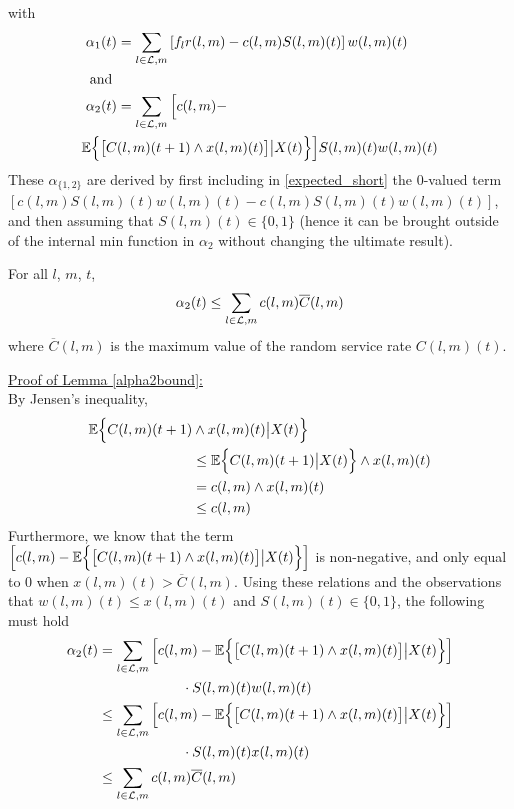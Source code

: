 with 
\begin{align} \label{a1_def}
\alpha_1 (t) &=  \sum_{l \in \linkset,m} \left[ f_l r(l,m) - c(l,m)S(l,m)(t) \right] w(l,m)(t)   \\
\nonumber \text{ and }&  \\ 
 \alpha_2 (t) & =  \sum_{l \in \linkset,m} \Big[ c(l,m)- \\ \nonumber
\expectation{ \big[C & (l,m)(t+1)\wedge x(l,m)(t)\big] \big| X(t) }  \Big] S(l,m)(t)w(l,m)(t)  
\end{align}
These $\alpha_{\{1,2\}}$ are derived by first including in \eqref{expected_short} the $0$-valued term $[c(l,m)S(l,m)(t)w(l,m)(t) - c(l,m)S(l,m)(t)w(l,m)(t)]$, and then assuming that $S(l,m)(t) \in \{0,1\}$ (hence it can be brought outside of the internal min function in $\alpha_2$ without changing the ultimate result). %
\begin{Lem} \label{alpha2bound}
For all $l$, $m$, $t$, 
\begin{equation} 
\alpha_2 (t) \leq \sum_{l \in \mathcal{L},m} c(l,m)\overline{C} (l,m)
\end{equation}
where $\overline{C} (l,m)$ is the maximum value of the random service rate $C(l,m)(t)$. 
\end{Lem}
\underline{Proof of Lemma \ref{alpha2bound}:} \\
By Jensen's inequality, 
\begin{align*}
\mathbb{E}\Big\{ C(l,m)(t+1) & \wedge x(l,m)(t) \big| X(t) \Big\} \\
& \leq \mathbb{E}\Big\{ C(l,m)(t+1) \big| X(t) \Big\}  \wedge x(l,m)(t) \\
&= c(l,m)\wedge x(l,m)(t) \\ 
&\leq c(l,m)
\end{align*}
 Furthermore, we know that the term 
$ \left[ c(l,m)- \mathbb{E}\Big\{  \big[C(l,m)(t+1)\wedge x(l,m)(t)\big] \big| X(t)  \Big\}  \right] $
is non-negative, and only equal to $0$ when $x(l,m)(t)>\overline C (l,m)$. 
Using these relations and the observations that $w(l,m)(t) \leq x(l,m)(t)$ and $S(l,m)(t)\in \{0,1\}$, the following must hold 
\begin{align*}
\alpha_2 (t) & = \sum_{l \in \mathcal{L},m} \left[ c(l,m)- \mathbb{E}\Big\{  \big[C(l,m)(t+1)\wedge x(l,m)(t)\big] \big| X(t)  \Big\}  \right] \\ &\qquad \qquad \qquad \cdot S(l,m)(t)w(l,m)(t) \\
& \leq \sum_{l \in \mathcal{L},m} \left[ c(l,m)- \mathbb{E}\Big\{  \big[C(l,m)(t+1)\wedge x(l,m)(t)\big] \big| X(t)  \Big\}  \right] \\ &\qquad \qquad \qquad \cdot S(l,m)(t)x(l,m)(t)   \\
& \leq \sum_{l \in \mathcal{L},m} c(l,m) \overline{C}(l,m)
 \end{align*}



